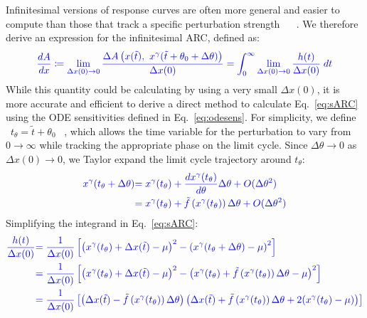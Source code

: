 \documentclass[11pt, letterpaper]{article}
\providecommand{\DIFadd}[1]{{\protect\color{blue}#1}} %
\providecommand{\DIFaddbegin}{} %
\providecommand{\DIFaddend}{} %
\begin{document}
\DIFaddbegin \DIFadd{Infinitesimal versions of response curves are often more general and easier to compute than those that track a specific perturbation strength \mbox{%
\cite{Rand2004}
}%
}\DIFaddend .
We therefore derive an expression for the infinitesimal ARC, defined as:
\DIFaddbegin \begin{equation}\DIFadd{
  \frac{dA}{dx} \coloneqq \lim_{\Delta x(0) \to 0} \frac{\Delta A\left(x(\tilde{t}),\ x^\gamma(\tilde{t} + \theta_0 + \Delta\theta)\right)}{\Delta x(0)} = \int_0^\infty \lim_{\Delta x(0) \to 0} \frac{h(t)}{\Delta x(0)} \; dt
  \label{eq:sARC}
}\end{equation}
\DIFaddend While this quantity could be calculating by using a very small $\Delta x(0)$, it is more accurate and efficient to derive a direct method to calculate Eq.~\ref{eq:sARC} using the ODE sensitivities defined in Eq.~\ref{eq:odesens}.
For simplicity, we define \DIFaddbegin \DIFadd{\mbox{%
$t_\theta = \tilde{t} + \theta_0$
}%
}\DIFaddend , which allows the time variable for the perturbation to vary from $0 \to \infty$ while tracking the appropriate phase on the limit cycle.
Since $\Delta \theta \to 0$ as $\Delta x(0) \to 0$, we Taylor expand the limit cycle trajectory around $t_\theta$:
\DIFaddbegin \begin{align}\DIFadd{
  x^\gamma(t_\theta + \Delta\theta) }&\DIFadd{= x^\gamma(t_\theta) +
  \frac{dx^\gamma(t_\theta)}{d\theta}\Delta\theta + O(\Delta\theta^2)}\\
  &\DIFadd{= x^\gamma(t_\theta) + \tilde{f}\left(x^\gamma(t_\theta)\right)\Delta\theta +
  O(\Delta\theta^2)
}\end{align}
\DIFadd{Simplifying }\DIFaddend the integrand in Eq.~\ref{eq:sARC}:
\DIFaddbegin \begin{align}\DIFadd{
  \frac{h(t)}{\Delta x(0)} }&\DIFadd{= \frac{1}{\Delta x(0)} \left[\left(x^\gamma(t_\theta) +
    \Delta x(\tilde{t}) - \mu\right)^2 - \left(x^\gamma(t_\theta +
    \Delta \theta) - \mu\right)^2 \right]}\\
  &\DIFadd{= \frac{1}{\Delta x(0)} \left[\left(x^\gamma(t_\theta) +
    \Delta x(\tilde{t}) - \mu\right)^2 - \left(x^\gamma(t_\theta) + \tilde{f}\left(x^\gamma(t_\theta)\right)\Delta\theta - \mu\right)^2 \right]}\\
  &\DIFadd{= \frac{1}{\Delta x(0)} \left[\left(\Delta x(\tilde{t}) -
    \tilde{f}\left(x^\gamma(t_\theta)\right)\Delta\theta\right) \left(\Delta
    x(\tilde{t}) + \tilde{f}\left(x^\gamma(t_\theta)\right)\Delta\theta +
    2(x^\gamma(t_\theta) - \mu)\right) \right]
}\end{align}
\end{document}

